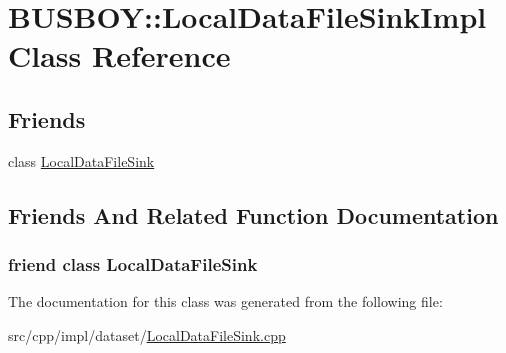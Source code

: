 \hypertarget{classBUSBOY_1_1LocalDataFileSinkImpl}{
\section{BUSBOY::LocalDataFileSinkImpl Class Reference}
\label{classBUSBOY_1_1LocalDataFileSinkImpl}
}
\subsection*{Friends}
\begin{DoxyCompactItemize}
\item 
class \hyperlink{classBUSBOY_1_1LocalDataFileSinkImpl_a8d2849e994292fc9316c92e4c7155f3b}{LocalDataFileSink}
\end{DoxyCompactItemize}


\subsection{Friends And Related Function Documentation}
\hypertarget{classBUSBOY_1_1LocalDataFileSinkImpl_a8d2849e994292fc9316c92e4c7155f3b}{
\subsubsection[{LocalDataFileSink}]{\setlength{\rightskip}{0pt plus 5cm}friend class {\bf LocalDataFileSink}}}
\label{classBUSBOY_1_1LocalDataFileSinkImpl_a8d2849e994292fc9316c92e4c7155f3b}


The documentation for this class was generated from the following file:\begin{DoxyCompactItemize}
\item 
src/cpp/impl/dataset/\hyperlink{LocalDataFileSink_8cpp}{LocalDataFileSink.cpp}\end{DoxyCompactItemize}
